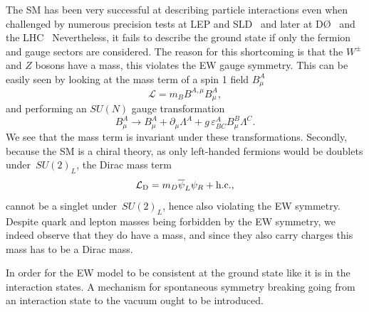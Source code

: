 \par The SM has been very successful at describing particle interactions even when challenged by numerous precision tests at LEP and SLD~\cite{ALEPH:2005ab,SLD:2000jop,Group:2012gb,ALEPH:2013dgf} and later at D\O~\cite{2011baz} and the LHC~\cite{CMS:2014mgj,ATLAS:2017rzl} Nevertheless, it fails to describe the ground state if only the fermion and gauge sectors are considered. The reason for this shortcoming is that the $W^\pm$ and $Z$ bosons have a mass, this violates the EW gauge symmetry. This can be easily seen by looking at the mass term of a spin 1 field $B^A_\mu$
\begin{equation}
    \mathcal{L} = m_B B^{A,\mu}B^A_\mu,
\end{equation}
and performing an $SU(N)$ gauge transformation 
\begin{equation}
    B^A_\mu \to B^A_\mu+\partial_\mu \Lambda ^A+g \,\varepsilon^A_{BC} B^B_\mu \Lambda^C.
\end{equation}
We see that the mass term is invariant under these transformations.
Secondly, because the SM is a chiral theory, as only left-handed fermions would be doublets under~$SU(2)_L$, the Dirac mass term
\begin{equation}
    \mathcal{L}_{\mathrm{D}} = m_D \overline \psi_L \psi_R+ \mathrm{h.c.},
\end{equation}          
cannot be a singlet under~$SU(2)_L$, hence also violating the EW symmetry. Despite quark and lepton masses being forbidden by the EW symmetry, we indeed observe that they do have a mass, and since they also carry charges this mass has to be a Dirac mass. 
\par In order for the EW model to be consistent at the ground state like it is in the interaction states. A mechanism for spontaneous symmetry breaking going from an interaction state to the vacuum ought to be introduced. 
